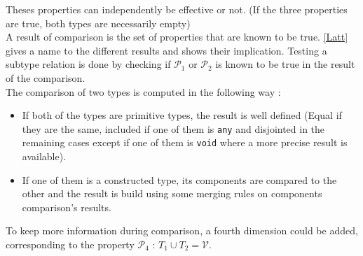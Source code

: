 \documentclass[10pt,a4paper]{article}
\newcommand{\whileyLine}{\lstinline[language=Whiley,basicstyle=\normalsize\ttfamily]}
\newcommand{\val}{\mathcal V}
\begin{document}
Theses properties can independently be effective or not. (If the three properties are true, both types are necessarily empty)\\


A result of comparison is the set of properties that are known to be true. \autoref{Latt} gives a name to the different results and shows their implication. Testing a subtype relation is done by checking if $\mathcal P_1$ or $\mathcal P_2$ is known to be true in the result of the comparison.\\



The comparison of two types is computed in the following way :
\begin{itemize}
	\item If both of the types are primitive types, the result is well defined (Equal if they are the same, included if one of them is \whileyLine{any} and disjointed in the remaining cases except if one of them is \whileyLine {void} where a more precise result is available). 
	\item If one of them is a constructed type, its components are compared to the other and the result is build using some merging rules on components comparison's results.
\end{itemize}


%










To keep more information during comparison, a fourth dimension could be added, corresponding to the property $\mathcal P_4$ : $T_1 \cup T_2 = \val$.\\
\end{document}
